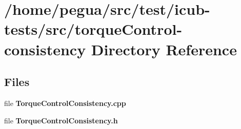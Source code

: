 \section{/home/pegua/src/test/icub-\/tests/src/torque\-Control-\/consistency Directory Reference}
\label{dir_ea8250e1e424defa140420a75e35c564}
\subsection*{Files}
\begin{DoxyCompactItemize}
\item 
file {\bfseries Torque\-Control\-Consistency.\-cpp}
\item 
file {\bfseries Torque\-Control\-Consistency.\-h}
\end{DoxyCompactItemize}
